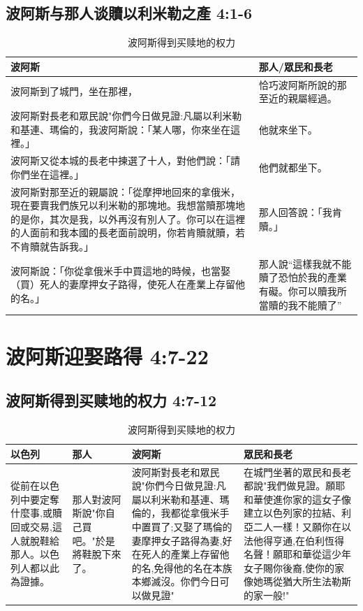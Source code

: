 \subsection{波阿斯与那人谈贖以利米勒之產 4:1-6}
\begin{table}[H]
\centering
\begin{tabular}{p{10.5cm}|p{6.7cm}}\hline
波阿斯&那人/眾民和長老\\\hline
波阿斯到了城門，坐在那裡，&恰巧波阿斯所說的那至近的親屬經過。\\\hline
波阿斯對長老和眾民說"你們今日做見證:凡屬以利米勒和基連、瑪倫的，我波阿斯說：「某人哪，你來坐在這裡。」&他就來坐下。\\\hline
波阿斯又從本城的長老中揀選了十人，對他們說：「請你們坐在這裡。」&他們就都坐下。 \\\hline
波阿斯對那至近的親屬說：「從摩押地回來的拿俄米，現在要賣我們族兄以利米勒的那塊地。我想當贖那塊地的是你，其次是我，以外再沒有別人了。你可以在這裡的人面前和我本國的長老面前說明，你若肯贖就贖，若不肯贖就告訴我。」&那人回答說：「我肯贖。」 \\\hline
波阿斯說：「你從拿俄米手中買這地的時候，也當娶（買）死人的妻摩押女子路得，使死人在產業上存留他的名。」 &那人說“這樣我就不能贖了恐怕於我的產業有礙。你可以贖我所當贖的我不能贖了”\\\hline
\end{tabular}
\caption{波阿斯得到买赎地的权力}
\end{table} 


\section{波阿斯迎娶路得 4:7-22}
\subsection{波阿斯得到买赎地的权力 4:7-12}
\begin{table}[H]
\centering
\begin{tabular}{p{2.5cm}|p{1.7cm}|p{5.8cm}|p{6.1cm}}\hline
以色列&那人&波阿斯&眾民和長老\\\hline
從前在以色列中要定奪什麼事,或贖回或交易,這人就脫鞋給那人。以色列人都以此為證據。
&那人對波阿斯說"你自己買吧。"於是將鞋脫下來了。
&波阿斯對長老和眾民說"你們今日做見證:凡屬以利米勒和基連、瑪倫的，我都從拿俄米手中置買了;又娶了瑪倫的妻摩押女子路得為妻,好在死人的產業上存留他的名,免得他的名在本族本鄉滅沒。你們今日可以做見證"
&在城門坐著的眾民和長老都說"我們做見證。願耶和華使進你家的這女子像建立以色列家的拉結、利亞二人一樣！又願你在以法他得亨通,在伯利恆得名聲！願耶和華從這少年女子賜你後裔,使你的家像她瑪從猶大所生法勒斯的家一般!"\\\hline
\end{tabular}
\caption{波阿斯得到买赎地的权力}
\end{table} 



